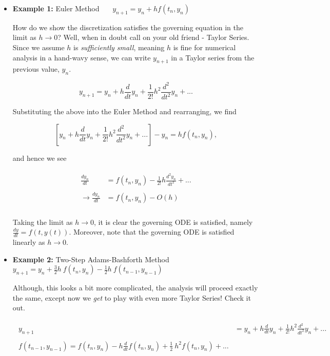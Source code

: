 \documentclass[paper=a4, fontsize=11pt]{scrartcl} %
\numberwithin{equation}{section} %
\numberwithin{figure}{section} %
\numberwithin{table}{section} %
\begin{document}
\begin{itemize}
\item {\bf{Example 1:}} Euler Method \ \  \ $y_{n+1} = y_n + h f(t_n,y_n)$ 

How do we show the discretization satisfies the governing equation in the limit as $h\rightarrow 0$? Well, when in doubt call on your old friend - Taylor Series. Since we assume $h$ is \emph{sufficiently small}, meaning $h$ is fine for numerical analysis in a hand-wavy sense, we can write $y_{n+1}$ in a Taylor series from the previous value, $y_n$.

$$y_{n+1} = y_n + h \frac{d}{dt} y_n + \frac{1}{2!} h^2 \frac{d^2}{dt^2} y_{n} + ...$$

Substituting the above into the Euler Method and rearranging, we find

$$\left[y_n + h \frac{d}{dt} y_n + \frac{1}{2!} h^2 \frac{d^2}{dt^2} y_{n} + ...\right] - y_n = h f(t_n,y_n),$$

and hence we see

\begin{align}
\nonumber
\begin{split}
 \frac{dy_{n}}{dt} &= f(t_n,y_n) - \frac{1}{2!} h \frac{d^2 y_n}{dt^2} + ... \\ \\
\rightarrow \frac{dy_{n}}{dt}&= f(t_n,y_n) - O(h) \\
\end{split}
\end{align}

Taking the limit as $h\rightarrow 0$, it is clear the governing ODE is satisfied, namely $\frac{dy}{dt} = f(t,y(t))$. Moreover, note that the governing ODE is satisfied linearly as $h\rightarrow 0$. \\

\item {\bf{Example 2:}} Two-Step Adams-Bashforth Method \ \ \ $y_{n+1} = y_n + \frac{3}{2}h\ f(t_n,y_n) - \frac{1}{2} h\ f(t_{n-1},y_{n-1})$

Although, this looks a bit more complicated, the analysis will proceed exactly the same, except now we \emph{get} to play with even more Taylor Series! Check it out.

\begin{align}
\nonumber
\begin{split}
y_{n+1} &= y_n + h \frac{d}{dt} y_n + \frac{1}{2!} h^2 \frac{d^2}{dt^2} y_{n} + ... \\ \\
f(t_{n-1},y_{n-1}) = f(t_n,y_n) - h \frac{d}{dt} f(t_n,y_n) + \frac{1}{2}\ h^2 f(t_n,y_n) + ... \\ 
\end{split}
\end{align}


\end{itemize}
\end{document}
